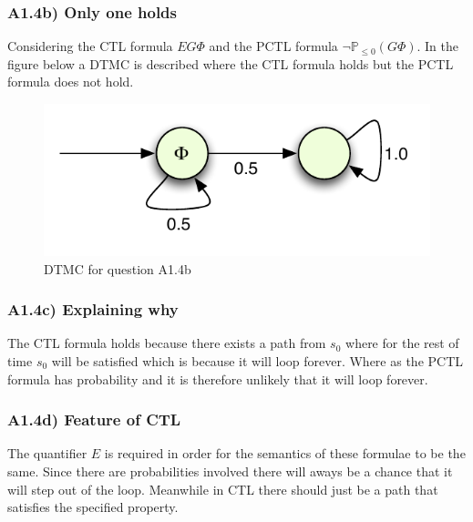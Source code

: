 \documentclass[12pt]{report}
\begin{document}
\subsubsection*{A1.4b) Only one holds}
Considering the CTL formula $EG \Phi$ and the PCTL formula $\neg \mathbb{P}_{\leq 0}(G \Phi)$. In the figure below a DTMC is described where the CTL formula holds but the PCTL formula does not hold.
\begin{figure}[H]
	\begin{center}
		\includegraphics[scale=.85]{../GFX/Answer-A1-4b.pdf}
	\end{center}
	\caption{DTMC for question A1.4b}
	\label{fig:1a14b}
\end{figure}

\subsubsection*{A1.4c) Explaining why}
The CTL formula holds because there exists a path from $s_0$ where for the rest of time $s_0$ will be satisfied which is because it will loop forever. Where as the PCTL formula has probability and it is therefore unlikely that it will loop forever.

\subsubsection*{A1.4d) Feature of CTL}
The quantifier $E$ is required in order for the semantics of these formulae to be the same. Since there are probabilities involved there will aways be a chance that it will step out of the loop. Meanwhile in CTL there should just be a path that satisfies the specified property.
\end{document}
